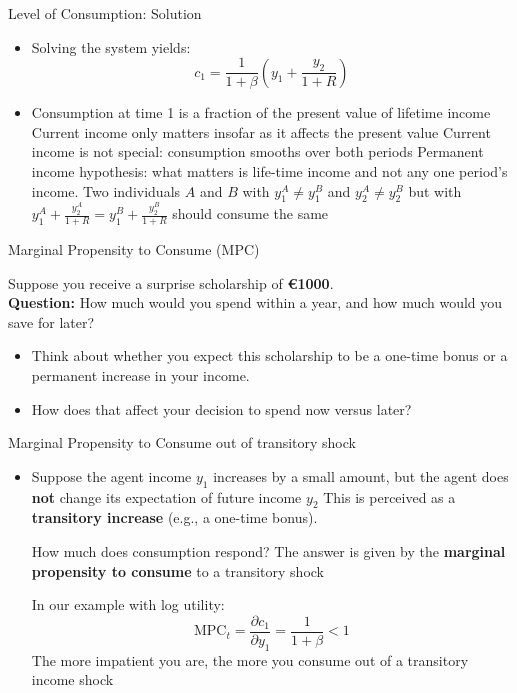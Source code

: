 \documentclass[10pt,aspectratio=169]{beamer}
\begin{document}
\begin{frame}{Level of Consumption: Solution}

\begin{itemize}
    \item Solving the system yields:
    \[
    c_1 = \frac{1}{1 + \beta} \left( y_1 + \frac{y_2}{1+R} \right)
    \]
    
        \item Consumption at time 1 is a fraction of the present value of lifetime income
        \itemvso Current income only matters insofar as it affects the present value
        \itemvso Current income is not special: consumption smooths over both periods
        \itemvso Permanent income hypothesis: what matters is life-time income and not any one period's
income.
\itemvso Two individuals $A$ and $B$ with $y^A_1 \neq y^B_1$ and $y^A_2 \neq y^B_2$ but with $y^A_1 + \frac{y^A_2}{1+R}=y^B_1 + \frac{y^B_2}{1+R}$  should consume the same
\end{itemize}
\end{frame}

\begin{frame}{Marginal Propensity to Consume (MPC)}
\begin{center}
\Large
Suppose you receive a surprise scholarship of \textbf{€1000}.\\[0.5cm]

\textbf{Question:} How much would you spend within a year, and how much would you save for later?
\end{center}

\pause
\begin{itemize}
    \item Think about whether you expect this scholarship to be a one-time bonus or a permanent increase in your income.
    \item How does that affect your decision to spend now versus later?
\end{itemize}
\end{frame}

\begin{frame}{Marginal Propensity to Consume out of transitory shock}

\begin{itemize}
    \item Suppose the agent income $y_1$ increases by a small amount, but the agent does \textbf{not} change its expectation of future income $y_2$
  \itemvso  This is perceived as a \textbf{transitory increase} (e.g., a one-time bonus).

    \itemvso How much does consumption respond? The answer is given by the \textbf{marginal propensity to consume} to a transitory shock
    
    \itemvso In our example with log utility:
    \[
    \text{MPC}_t = \frac{\partial c_1}{\partial y_1} = \frac{1}{1 + \beta} < 1
    \]
\itemvso The more impatient you are, the more you consume out of a transitory income shock
\end{itemize}
\end{frame}
\end{document}
